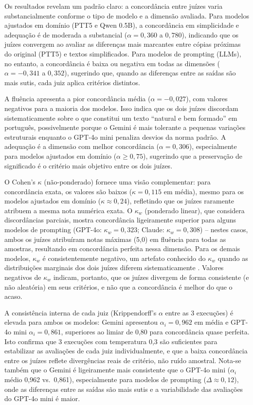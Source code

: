 \documentclass[a4paper, twocolumn, 11pt, twoside]{article}
\begin{document}
Os resultados revelam um padrão claro: a concordância entre juízes
varia substancialmente conforme o tipo de modelo e a dimensão avaliada.
Para modelos ajustados em domínio (PTT5 e Qwen 0.5B), a concordância em
simplicidade e adequação é de moderada a substancial
($\alpha = 0,360$ a $0,780$), indicando que os juízes convergem ao
avaliar as diferenças mais marcantes entre cópias próximas do original
(PTT5) e textos simplificados. Para modelos de prompting (LLMs),
no entanto, a concordância é baixa ou negativa em todas as dimensões
($\alpha = -0,341$ a $0,352$), sugerindo que, quando as diferenças
entre as saídas são mais sutis, cada juiz aplica critérios distintos.

A fluência apresenta a pior concordância média ($\alpha = -0,027$),
com valores negativos para a maioria dos modelos. Isso indica que
os dois juízes discordam sistematicamente sobre o que constitui um
texto ``natural e bem formado'' em português, possivelmente porque o
Gemini é mais tolerante a pequenas variações estruturais enquanto o
GPT-4o mini penaliza desvios da norma padrão. A adequação é a dimensão
com melhor concordância ($\alpha = 0,306$), especialmente para modelos
ajustados em domínio ($\alpha \geq 0,75$), sugerindo que a preservação de
significado é o critério mais objetivo entre os dois juízes.

O Cohen's $\kappa$ (não-ponderado) fornece uma visão complementar:
para concordância exata, os valores são baixos ($\kappa = 0,115$ em
média), mesmo para os modelos ajustados em domínio ($\kappa \approx 0,24$),
refletindo que os juízes raramente atribuem a mesma nota numérica
exata. O $\kappa_w$ (ponderado linear), que considera discordâncias
parciais, mostra concordância ligeiramente superior para alguns
modelos de prompting (GPT-4o: $\kappa_w = 0,323$; Claude:
$\kappa_w = 0,308$) -- nestes casos, ambos os juízes atribuíram notas
máximas (5,0) em fluência para todas as amostras, resultando em
concordância perfeita nessa dimensão. Para os demais modelos,
$\kappa_w$ é consistentemente negativo, um artefato conhecido do
$\kappa_w$ quando as distribuições marginais dos dois juízes diferem
sistematicamente \citep{feinstein1990kappa}. Valores negativos de
$\kappa_w$ indicam, portanto, que os juízes divergem de forma
consistente (e não aleatória) em seus critérios, e não que a
concordância é melhor do que o acaso.

A consistência interna de cada juiz (Krippendorff's $\alpha$ entre as
3 execuções) é elevada para ambos os modelos: Gemini apresentou
$\alpha_i = 0,962$ em média e GPT-4o mini $\alpha_i = 0,861$,
superiores ao limiar de 0,80 para concordância quase perfeita. Isto
confirma que 3 execuções com temperatura 0,3 são suficientes para
estabilizar as avaliações de cada juiz individualmente, e que a baixa
concordância entre os juízes reflete divergências reais de critério,
não ruído amostral. Nota-se também que o Gemini é ligeiramente mais
consistente que o GPT-4o mini ($\alpha_i$ médio 0,962 vs.\ 0,861),
especialmente para modelos de prompting ($\Delta \approx 0,12$), onde
as diferenças entre as saídas são mais sutis e a variabilidade das
avaliações do GPT-4o mini é maior.
\end{document}
